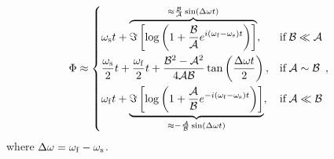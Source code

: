 \documentclass[usenatbib,a4paper,times,fleqn]{mnras}
\begin{document}
\begin{align}
 \Phi  &\approx\begin{dcases}
          \omega_{\rm s}t+\overbrace{\Im\left[\log\left(1+\frac{\mathcal B}{\mathcal A}e^{i( \omega_{\rm f}- \omega_{\rm s})t}\right)\right]}^{\approx\frac{\mathcal B}{\mathcal A}\sin(\Delta\omega t)},& {\rm if}\, \mathcal B\ll \mathcal A\\
         \frac{\omega_{\rm s}}{2}t+\frac{\omega_{\rm f}}{2}t+  
         \frac{ \mathcal B^2-\mathcal A^2}{4 \mathcal A \mathcal B}\tan \left(\frac{\Delta\omega t}{2}\right),
         & {\rm if}\, \mathcal A\sim \mathcal B \\
         \omega_{\rm f}t+\underbrace{\Im\left[\log\left(1+\frac{\mathcal A}{\mathcal B}e^{-i( \omega_{\rm f}- \omega_{\rm s})t}\right)\right]}_{\approx-\frac{\mathcal A}{\mathcal B}\sin(\Delta\omega t)},& {\rm if}\, \mathcal A\ll \mathcal B
         \end{dcases},\label{appendix:phit}
\end{align}
where $\Delta\omega=\omega_{\rm f}-\omega_{\rm s}$.

\label{lastpage}
\end{document}
